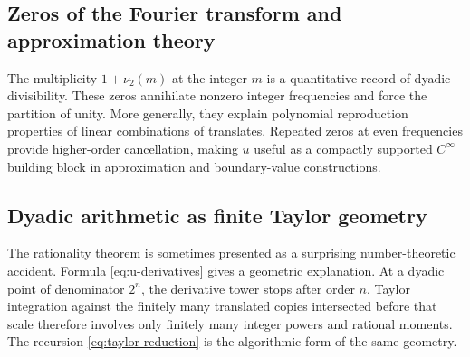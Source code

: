 \documentclass[11pt]{article}
\theoremstyle{definition}
\theoremstyle{remark}
\begin{document}
\subsection{Zeros of the Fourier transform and approximation theory}
The multiplicity $1+\nu_2(m)$ at the integer $m$ is a quantitative record of dyadic divisibility.  These zeros annihilate nonzero integer frequencies and force the partition of unity.  More generally, they explain polynomial reproduction properties of linear combinations of translates.  Repeated zeros at even frequencies provide higher-order cancellation, making $u$ useful as a compactly supported $C^\infty$ building block in approximation and boundary-value constructions.

\subsection{Dyadic arithmetic as finite Taylor geometry}
The rationality theorem is sometimes presented as a surprising number-theoretic accident.  Formula \eqref{eq:u-derivatives} gives a geometric explanation.  At a dyadic point of denominator $2^n$, the derivative tower stops after order $n$.  Taylor integration against the finitely many translated copies intersected before that scale therefore involves only finitely many integer powers and rational moments.  The recursion \eqref{eq:taylor-reduction} is the algorithmic form of the same geometry.
\end{document}
